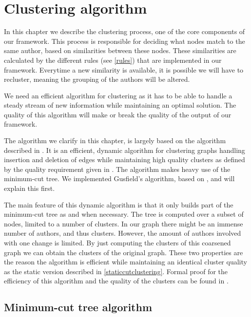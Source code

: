 \chapter{Clustering algorithm}

In this chapter we describe the clustering process, one of the core components of our framework. This process is responsible for deciding what nodes match to the same author, based on similarities between these nodes. These similarities are calculated by the different rules (see \autoref{rules}) that are implemented in our framework. Everytime a new similarity is available, it is possible we will have to recluster, meaning the grouping of the authors will be altered.

We need an efficient algorithm for clustering as it has to be able to handle a steady stream of new information while maintaining an optimal solution. The quality of this algorithm will make or break the quality of the output of our framework.

The algorithm we clarify in this chapter, is largely based on the algorithm described in \cite{saha2006dynamic}. It is an efficient, dynamic algorithm for clustering graphs handling insertion and deletion of edges while maintaining high quality clusters as defined by the quality requirement given in \cite{flake2004graph}. The algorithm makes heavy use of the minimum-cut tree. We implemented Gusfield's algorithm, based on \cite{rodrigues2011mpi}, and will explain this first.

The main feature of this dynamic algorithm is that it only builds part of the minimum-cut tree as and when necessary. The tree is computed over a subset of nodes, limited to a number of clusters. In our graph there might be an immense number of authors, and thus clusters. However, the amount of authors involved with one change is limited. By just computing the clusters of this coarsened graph we can obtain the clusters of the original graph. These two properties are the reason the algorithm is efficient while maintaining an identical cluster quality as the static version described in \autoref{staticcutclustering}. Formal proof for the efficiency of this algorithm and the quality of the clusters can be found in \cite{saha2006dynamic}.

\section{Minimum-cut tree algorithm}
\label{minimumcuttree}

